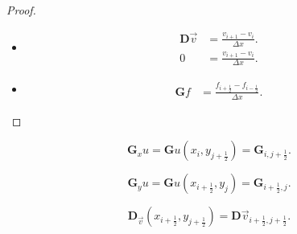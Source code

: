 \begin{proof}\leavevmode
	\begin{itemize}
		\item

		      \begin{align*}
			      \symbf{D}\vec{v} & =
			      \frac{v_{i+1}-v_{i}}{\Delta x}. \\
			      0                & =
			      \frac{v_{i+1}-v_{i}}{\Delta x}.
		      \end{align*}

		\item

		      \begin{align*}
			      \symbf{G}f & =
			      \frac{f_{i+\frac{1}{2}}-f_{i-\frac{1}{2}}}{\Delta x}.
		      \end{align*}
	\end{itemize}
\end{proof}

\begin{equation*}
	\symbf{G}_{x}u=
	\symbf{G}u\left(x_{i},y_{j+\frac{1}{2}}\right)=
	\symbf{G}_{i,j+\frac{1}{2}}.
\end{equation*}

\begin{equation*}
	\symbf{G}_{y}u=
	\symbf{G}u\left(x_{i+\frac{1}{2}},y_{j}\right)=
	\symbf{G}_{i+\frac{1}{2},j}.
\end{equation*}

\begin{equation*}
	\symbf{D}_{\vec{v}}\left(x_{i+\frac{1}{2}},y_{j+\frac{1}{2}}\right)=
	\symbf{D}\vec{v}_{i+\frac{1}{2},j+\frac{1}{2}}.
\end{equation*}
